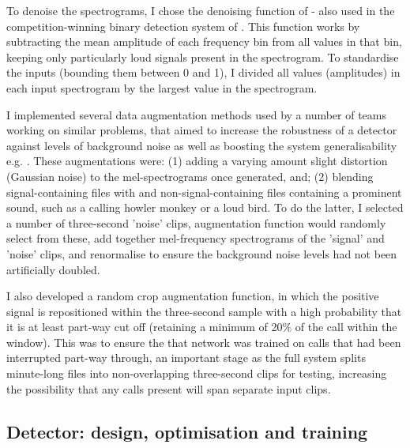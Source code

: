 \documentclass[11pt]{article}
\begin{document}
To denoise the spectrograms, I chose the denoising function of \cite{aide2013real} - also used in the competition-winning binary detection system of \cite{kahl2017large}. This function works by subtracting the mean amplitude of each frequency bin from all values in that bin, keeping only particularly loud signals present in the spectrogram. To standardise the inputs (bounding them between 0 and 1), I divided all values (amplitudes) in each input spectrogram by the largest value in the spectrogram. 

I implemented several data augmentation methods used by a number of teams working on similar problems, that aimed to increase the robustness of a detector against levels of background noise as well as boosting the system generalisability e.g. \cite{sprengel2016audio,kahl2017large}. These augmentations were: (1) adding a varying amount slight distortion (Gaussian noise) to the mel-spectrograms once generated, and; (2) blending signal-containing files with and non-signal-containing files containing a prominent sound, such as a calling howler monkey or a loud bird. To do the latter, I selected a number of three-second 'noise' clips,  augmentation function would randomly select from these, add together mel-frequency spectrograms of the 'signal' and 'noise' clips, and renormalise to ensure the background noise levels had not been artificially doubled. 

I also developed a random crop augmentation function, in which the positive signal is repositioned within the three-second sample with a high probability that it is at least part-way cut off (retaining a minimum of 20\% of the call within the window). This was to ensure the that network was trained on calls that had been interrupted part-way through, an important stage as the full system splits minute-long files into non-overlapping three-second clips for testing, increasing the possibility that any calls present will span separate input clips. 

\subsection{Detector: design, optimisation and training}
\end{document}
